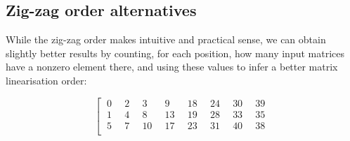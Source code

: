 \documentclass[11pt]{llncs}
\begin{document}
\subsection{Zig-zag order alternatives}

While the zig-zag order makes intuitive and practical sense, we can obtain slightly better results by counting, for each position, how many input matrices have a nonzero element there, and using these values to infer a better matrix linearisation order:

\[ \left[ \begin{array}{rrrrrrrr}
\hspace{3pt} 0\hspace{3pt} & \hspace{3pt} 2\hspace{3pt} & \hspace{3pt} 3\hspace{3pt} & \hspace{3pt} 9\hspace{3pt} & \hspace{3pt}18\hspace{3pt} & \hspace{3pt}24\hspace{3pt} & \hspace{3pt}30\hspace{3pt} & \hspace{3pt}39\hspace{3pt} \\
\hspace{3pt} 1\hspace{3pt} & \hspace{3pt} 4\hspace{3pt} & \hspace{3pt} 8\hspace{3pt} & \hspace{3pt}13\hspace{3pt} & \hspace{3pt}19\hspace{3pt} & \hspace{3pt}28\hspace{3pt} & \hspace{3pt}33\hspace{3pt} & \hspace{3pt}35\hspace{3pt} \\
\hspace{3pt} 5\hspace{3pt} & \hspace{3pt} 7\hspace{3pt} & \hspace{3pt}10\hspace{3pt} & \hspace{3pt}17\hspace{3pt} & \hspace{3pt}23\hspace{3pt} & \hspace{3pt}31\hspace{3pt} & \hspace{3pt}40\hspace{3pt} & \hspace{3pt}38\hspace{3pt} \\

\end{array}\]
\end{document}
